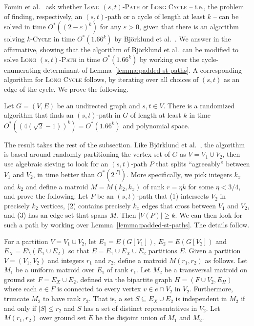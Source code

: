 \documentclass{theoretics}
\begin{document}
Fomin et al.~\cite{FominGKSS24} ask whether \textsc{Long
  $(s,t)$-Path} or \textsc{Long Cycle} -- i.e., the problem of finding,
respectively, an $(s,t)$-path or a cycle of length at least $k$ -- can be
solved in time $O^*((2-\varepsilon)^k)$ for any $\varepsilon > 0$,
given that there is an algorithm solving \textsc{$k$-Cycle} in time
$O^*(1.66^k)$ by Bj\"orklund et al.~\cite{BjorklundHKK17narrow}.
We answer in the affirmative, showing that the algorithm of Bj\"orklund
et al.\ can be modified to solve \textsc{Long $(s,t)$-Path} in time
$O^*(1.66^k)$ by working over the cycle-enumerating determinant
of Lemma~\ref{lemma:padded-st-paths}. 
A corresponding algorithm for \textsc{Long Cycle} follows, by
iterating over all choices of $(s,t)$ as an edge of the cycle. 
We prove the following.

\begin{theorem} \label{theorem:long-path}
  Let $G=(V,E)$ be an undirected graph and $s, t \in V$.
  There is a randomized algorithm that finds an $(s,t)$-path in $G$ of length at
  least $k$ in time $O^*((4(\sqrt{2}-1))^k)=O^*(1.66^k)$ and polynomial space.
\end{theorem}

The result takes the rest of the subsection. Like Bj\"orklund et
al.~\cite{BjorklundHKK17narrow}, the algorithm is based around
randomly partitioning the vertex set of $G$ as $V=V_1 \cup V_2$,
then use algebraic sieving to look for an $(s,t)$-path $P$ that splits
``agreeably'' between $V_1$ and $V_2$, in time better than
$O^*(2^{|P|})$. More specifically, we pick integers $k_x$ and $k_2$
and define a matroid $M=M(k_2,k_x)$ of rank $r=\eta k$ for some $\eta < 3/4$, 
and prove the following: Let $P$ be an $(s,t)$-path that (1) intersects $V_2$ in
precisely $k_2$ vertices, (2) contains precisely $k_x$ edges that
cross between $V_1$ and $V_2$, and (3) has an edge set that spans $M$.
Then $|V(P)| \geq k$. We can then look for such a path
by working over Lemma~\ref{lemma:padded-st-paths}. The details follow.

For a partition $V=V_1 \cup V_2$, let $E_1=E(G[V_1])$,
$E_2=E(G[V_2])$ and $E_X=E \setminus (E_1 \cup E_2)$ so that
$E=E_1 \cup E_X \cup E_2$ partitions $E$. 
Given a partition $V=(V_1,V_2)$ and integers $r_1$ and $r_2$, 
define a matroid $M(r_1,r_2)$ as follows.
Let $M_1$ be a uniform matroid over $E_1$ of rank $r_1$.
Let $M_2$ be a transversal matroid on ground set $F=E_X \cup E_2$,
defined via the bipartite graph $H=(F \cup V_2, E_H)$
where each $e \in F$ is connected to every vertex $v \in e \cap V_2$ in $V_2$. 
Furthermore, truncate $M_2$ to have rank $r_2$. 
That is, a set $S \subseteq E_X \cup E_2$ is independent in $M_2$
if and only if $|S| \leq r_2$ and $S$ has a set of distinct
representatives in $V_2$. Let $M(r_1,r_2)$ over ground set $E$
be the disjoint union of $M_1$ and $M_2$.
\end{document}
